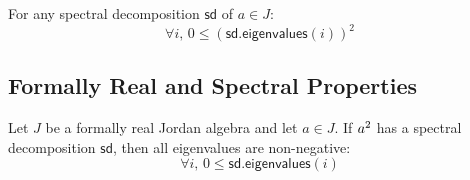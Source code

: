 \begin{theorem}
For any spectral decomposition $\mathsf{sd}$ of $a \in J$:
\[ \forall i,\, 0 \le (\mathsf{sd}.\mathsf{eigenvalues}(i))^2 \]
\end{theorem}

\subsection{Formally Real and Spectral Properties}

\begin{theorem}
Let $J$ be a formally real Jordan algebra and let $a \in J$. If $a^{2}$ has a spectral decomposition $\mathsf{sd}$, then all eigenvalues are non-negative:
\[ \forall i,\, 0 \le \mathsf{sd}.\mathsf{eigenvalues}(i) \]
\end{theorem}
